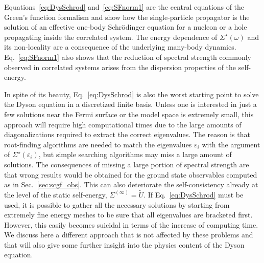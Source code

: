 Equations~\eqref{eq:DysSchrod} and~\eqref{eq:SFnorm1} are the central equations of the Green's function formalism and show how the
single-particle propagator is the solution of an effective one-body Schr\"odinger equation for a nucleon or a
hole propagating inside the correlated system. The energy dependence of  $\Sigma^\star(\omega)$  and its non-locality are a consequence of the underlying  many-body dynamics. Eq.~\eqref{eq:SFnorm1} also shows that the reduction of spectral strength commonly observed in correlated systems arises from the dispersion
properties of the self-energy.

 In spite of its beauty, Eq.~\eqref{eq:DysSchrod} is also the worst starting point to solve the Dyson equation in a discretized finite basis. Unless one is interested in just a few solutions near the Fermi surface or the model space is extremely small, this approach will require high computational times due to the large amounts of diagonalizations required to extract the correct eigenvalues. The reason is that root-finding algorithms are needed to match the eigenvalues $\varepsilon_i$ with the argument of  $\Sigma^\star(\varepsilon_i)$, but simple searching algorithms may miss a large amount of solutions. The consequences of missing a large portion of spectral strength are that wrong results would be obtained for the ground state observables computed as in Sec.~\ref{sec:scgf_obs}. This can also deteriorate the self-consistency already at the level of the static self-energy, $\Sigma^{(\infty)}=\widetilde{U}$.  If Eq.~\eqref{eq:DysSchrod} must be used, it is possible to gather all the necessary solutions by starting from extremely fine energy meshes to be sure that all eigenvalues are bracketed first. However, this easily becomes suicidal in terms of the increase of computing time.
We discuss here a different approach that is not affected by these problems and that will also give some further insight into the physics content of the Dyson equation.

